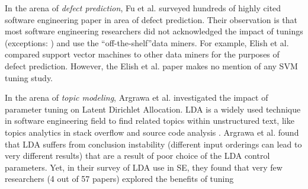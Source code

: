 \documentclass[sigconf,review, anonymous]{acmart}
\theoremstyle{break}
\begin{document}
\begin{table}[htp]
   \caption {List of Parameters Tuned by This Paper.}
\centering
{}
\label{tab:parameters}
\end{table}

In the arena of {\em defect prediction}, 
Fu et al.\cite{fu2016tuning}  surveyed hundreds of highly 
cited software engineering paper in area of defect prediction. 
Their observation is that most software engineering  researchers
did not acknowledged the impact of tunings 
(exceptions: \cite{lessmann2008benchmarking,tantithamthavorn2016automated}) and
use the ``off-the-shelf''data miners. For example, 
Elish et al.\cite{elish2008predicting} compared support vector machines
to other data miners for the purposes of defect prediction.
However, the Elish et al. paper makes no mention of any SVM tuning study.

In the arena of {\em topic modeling}, Argrawa et al.\cite{agrawal2016wrong} investigated 
the impact of parameter tuning on Latent Dirichlet Allocation.
LDA 
  is a widely used technique in software engineering field
to find related topics within unstructured text, 
like topics analytics in stack overflow \cite{barua2014developers}
and source code analysis \cite{binkley2014understanding}.
 Argrawa et al. found that LDA suffers from conclusion instability
(different input orderings can lead to very different results)
that are a result of poor choice of the LDA control parameters. 
Yet, in their survey of LDA use in SE, they found that very few  
researchers (4 out of 57 papers) explored the benefits of tuning
\end{document}
